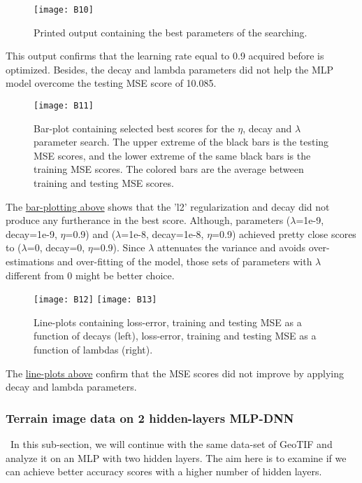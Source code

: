 \begin{figure}[H]
\label{fig:B7}
\centering
\texttt{[image: B10]}
\caption{Printed output containing the best parameters of the searching.}
\end{figure}

This output confirms that the learning rate equal to 0.9 acquired before is optimized. Besides, the decay and lambda parameters did not help the MLP model overcome the testing MSE score of 10.085.

\begin{figure}[H]
\label{fig:B8}
\centering
\texttt{[image: B11]}
\caption{Bar-plot containing selected best scores for the $\eta$, decay and $\lambda$ parameter search. The upper extreme of the black bars is the testing MSE scores, and the lower extreme of the same black bars is the training MSE scores. The colored bars are the average between training and testing MSE scores.}
\end{figure}

The \hyperref[fig:B8]{bar-plotting above} shows that the 'l2' regularization and decay did not produce any furtherance in the best score. Although, parameters ($\lambda$=1e-9, decay=1e-9, $\eta$=0.9) and ($\lambda$=1e-8, decay=1e-8, $\eta$=0.9) achieved pretty close scores to ($\lambda$=0, decay=0, $\eta$=0.9). Since $\lambda$ attenuates the variance and avoids over-estimations and over-fitting of the model, those sets of parameters with $\lambda$ different from 0 might be better choice.

\begin{figure}[H]
\label{fig:B9}
\centering
\texttt{[image: B12]}
\texttt{[image: B13]}
\caption{Line-plots containing loss-error, training and testing MSE as a function of decays (left), loss-error, training and testing MSE as a function of lambdas (right).}
\end{figure}

The \hyperref[fig:B9]{line-plots above} confirm that the MSE scores did not improve by applying decay and lambda parameters.

\subsubsection{Terrain image data on 2 hidden-layers MLP-DNN}
\label{chap:Terrain image data on 2 hidden-layers MLP-DNN}

\qquad \, In this sub-section, we will continue with the same data-set of GeoTIF and analyze it on an MLP with two hidden layers. The aim here is to examine if we can achieve better accuracy scores with a higher number of hidden layers.\\

